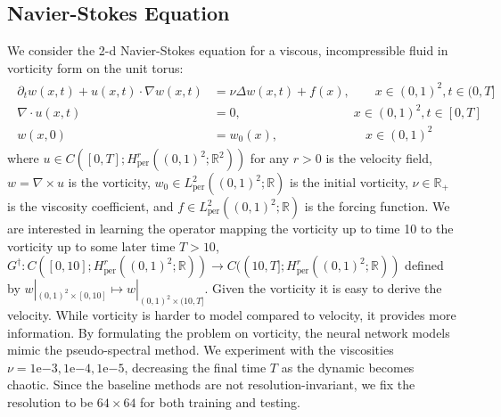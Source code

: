 \documentclass{article} %
\newcommand{\R}{\mathbb{R}}
\newcommand{\Ftrue}{G^\dagger}
\begin{document}
\subsection{ Navier-Stokes Equation}
\label{sec:ns}
We consider the 2-d Navier-Stokes equation for a viscous, incompressible fluid in vorticity form on the unit torus:
\begin{align}
\begin{split}
\partial_t w(x,t) + u(x,t) \cdot \nabla w(x,t) &= \nu \Delta w(x,t) + f(x), \qquad x \in (0,1)^2, t \in (0,T]  \\
\nabla \cdot u(x,t) &= 0, \qquad \qquad \qquad \qquad \quad x \in (0,1)^2, t \in [0,T]  \\
w(x,0) &= w_0(x), \qquad \qquad \qquad \quad x \in (0,1)^2 
\end{split}
\end{align}
where $u \in C([0,T]; H^r_{\text{per}}((0,1)^2; \R^2))$ for any $r>0$ is the velocity field, $w = \nabla \times u$ is the vorticity, $w_0 \in L^2_{\text{per}}((0,1)^2;\R)$ is the initial vorticity,  $\nu \in \R_+$ is the viscosity coefficient, and $f \in L^2_{\text{per}}((0,1)^2;\R)$ is the forcing function. We are interested in learning the operator mapping the vorticity up to time 10 to the vorticity up to some later time $T > 10$,
$\Ftrue: C([0,10]; H^r_{\text{per}}((0,1)^2; \R)) \to C((10,T]; H^r_{\text{per}}((0,1)^2; \R))$
defined by $w|_{(0,1)^2 \times [0,10]} \mapsto w|_{(0,1)^2 \times (10,T]}$. 
Given the vorticity it is easy to derive the velocity. While vorticity is harder to model compared to velocity, it provides more information. By formulating the problem on vorticity, the neural network models mimic the pseudo-spectral method. 
We experiment with the viscosities $\nu = 1\mathrm{e}{-3}, 1\mathrm{e}{-4}, 1\mathrm{e}{-5}$, decreasing the final time $T$ as the dynamic becomes chaotic.
Since the baseline methods are not resolution-invariant, we fix the resolution to be $64 \times 64$ for both training and testing.

\end{document}
